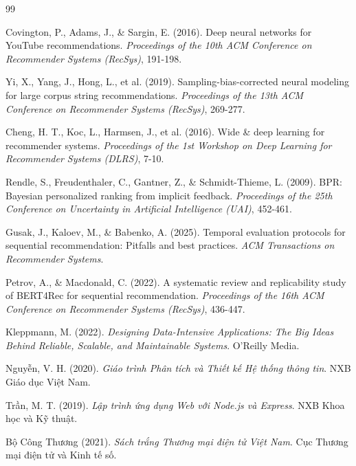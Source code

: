 \documentclass[12pt,a4paper]{report}
\begin{document}
\begin{thebibliography}{99}

Covington, P., Adams, J., \& Sargin, E. (2016). Deep neural networks for YouTube recommendations. \textit{Proceedings of the 10th ACM Conference on Recommender Systems (RecSys)}, 191-198.

Yi, X., Yang, J., Hong, L., et al. (2019). Sampling-bias-corrected neural modeling for large corpus string recommendations. \textit{Proceedings of the 13th ACM Conference on Recommender Systems (RecSys)}, 269-277.

Cheng, H. T., Koc, L., Harmsen, J., et al. (2016). Wide \& deep learning for recommender systems. \textit{Proceedings of the 1st Workshop on Deep Learning for Recommender Systems (DLRS)}, 7-10.

Rendle, S., Freudenthaler, C., Gantner, Z., \& Schmidt-Thieme, L. (2009). BPR: Bayesian personalized ranking from implicit feedback. \textit{Proceedings of the 25th Conference on Uncertainty in Artificial Intelligence (UAI)}, 452-461.

Gusak, J., Kaloev, M., \& Babenko, A. (2025). Temporal evaluation protocols for sequential recommendation: Pitfalls and best practices. \textit{ACM Transactions on Recommender Systems}.

Petrov, A., \& Macdonald, C. (2022). A systematic review and replicability study of BERT4Rec for sequential recommendation. \textit{Proceedings of the 16th ACM Conference on Recommender Systems (RecSys)}, 436-447.

Kleppmann, M. (2022). \textit{Designing Data-Intensive Applications: The Big Ideas Behind Reliable, Scalable, and Maintainable Systems}. O'Reilly Media.

Nguyễn, V. H. (2020). \textit{Giáo trình Phân tích và Thiết kế Hệ thống thông tin}. NXB Giáo dục Việt Nam.

Trần, M. T. (2019). \textit{Lập trình ứng dụng Web với Node.js và Express}. NXB Khoa học và Kỹ thuật.

Bộ Công Thương (2021). \textit{Sách trắng Thương mại điện tử Việt Nam}. Cục Thương mại điện tử và Kinh tế số.


\end{thebibliography}
\end{document}
